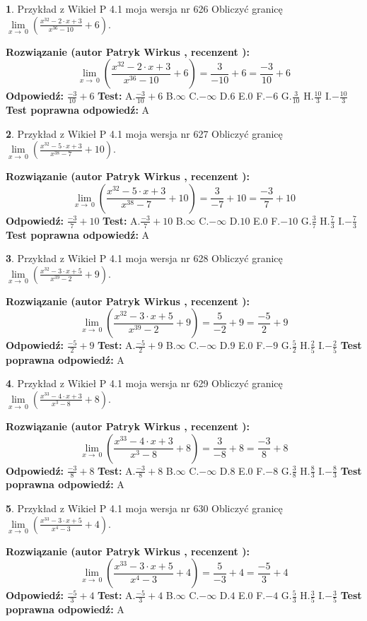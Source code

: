\documentclass[12pt, a4paper]{article}
\theoremstyle{definition} %
\newtheorem{zad}{}
\newcommand{\zadStart}[1]{\begin{zad}#1\newline}
\newcommand{\zadStop}{\end{zad}}
\newcommand{\rozwStart}[2]{\noindent \textbf{Rozwiązanie (autor #1 , recenzent #2): }\newline}
\newcommand{\rozwStop}{\newline}
\newcommand{\odpStart}{\noindent \textbf{Odpowiedź:}\newline}
\newcommand{\odpStop}{\newline}
\newcommand{\testStart}{\noindent \textbf{Test:}\newline}
\newcommand{\testStop}{\newline}
\newcommand{\kluczStart}{\noindent \textbf{Test poprawna odpowiedź:}\newline}
\newcommand{\kluczStop}{\newline}
\begin{document}
\zadStart{Przykład z Wikieł P 4.1 moja wersja nr 626}
Obliczyć granicę $\lim\limits_{x\to\ 0}(\frac{x^{32}-2 \cdot x +3}{x^{36}-10}+6)$.
\zadStop
\rozwStart{Patryk Wirkus}{}
$$\lim\limits_{x\to\ 0}(\frac{x^{32}-2 \cdot x +3}{x^{36}-10}+6)=\frac{3}{-10}+6=\frac{-3}{10}+6$$
\rozwStop
\odpStart
$\frac{-3}{10}+6$
\odpStop
\testStart
A.$\frac{-3}{10}+6$
B.$\infty$
C.$-\infty$
D.$6$
E.$0$
F.$-6$
G.$\frac{3}{10}$
H.$\frac{10}{3}$
I.$-\frac{10}{3}$
\testStop
\kluczStart
A
\kluczStop



\zadStart{Przykład z Wikieł P 4.1 moja wersja nr 627}
Obliczyć granicę $\lim\limits_{x\to\ 0}(\frac{x^{32}-5 \cdot x +3}{x^{38}-7}+10)$.
\zadStop
\rozwStart{Patryk Wirkus}{}
$$\lim\limits_{x\to\ 0}(\frac{x^{32}-5 \cdot x +3}{x^{38}-7}+10)=\frac{3}{-7}+10=\frac{-3}{7}+10$$
\rozwStop
\odpStart
$\frac{-3}{7}+10$
\odpStop
\testStart
A.$\frac{-3}{7}+10$
B.$\infty$
C.$-\infty$
D.$10$
E.$0$
F.$-10$
G.$\frac{3}{7}$
H.$\frac{7}{3}$
I.$-\frac{7}{3}$
\testStop
\kluczStart
A
\kluczStop



\zadStart{Przykład z Wikieł P 4.1 moja wersja nr 628}
Obliczyć granicę $\lim\limits_{x\to\ 0}(\frac{x^{32}-3 \cdot x +5}{x^{39}-2}+9)$.
\zadStop
\rozwStart{Patryk Wirkus}{}
$$\lim\limits_{x\to\ 0}(\frac{x^{32}-3 \cdot x +5}{x^{39}-2}+9)=\frac{5}{-2}+9=\frac{-5}{2}+9$$
\rozwStop
\odpStart
$\frac{-5}{2}+9$
\odpStop
\testStart
A.$\frac{-5}{2}+9$
B.$\infty$
C.$-\infty$
D.$9$
E.$0$
F.$-9$
G.$\frac{5}{2}$
H.$\frac{2}{5}$
I.$-\frac{2}{5}$
\testStop
\kluczStart
A
\kluczStop



\zadStart{Przykład z Wikieł P 4.1 moja wersja nr 629}
Obliczyć granicę $\lim\limits_{x\to\ 0}(\frac{x^{33}-4 \cdot x +3}{x^{3}-8}+8)$.
\zadStop
\rozwStart{Patryk Wirkus}{}
$$\lim\limits_{x\to\ 0}(\frac{x^{33}-4 \cdot x +3}{x^{3}-8}+8)=\frac{3}{-8}+8=\frac{-3}{8}+8$$
\rozwStop
\odpStart
$\frac{-3}{8}+8$
\odpStop
\testStart
A.$\frac{-3}{8}+8$
B.$\infty$
C.$-\infty$
D.$8$
E.$0$
F.$-8$
G.$\frac{3}{8}$
H.$\frac{8}{3}$
I.$-\frac{8}{3}$
\testStop
\kluczStart
A
\kluczStop



\zadStart{Przykład z Wikieł P 4.1 moja wersja nr 630}
Obliczyć granicę $\lim\limits_{x\to\ 0}(\frac{x^{33}-3 \cdot x +5}{x^{4}-3}+4)$.
\zadStop
\rozwStart{Patryk Wirkus}{}
$$\lim\limits_{x\to\ 0}(\frac{x^{33}-3 \cdot x +5}{x^{4}-3}+4)=\frac{5}{-3}+4=\frac{-5}{3}+4$$
\rozwStop
\odpStart
$\frac{-5}{3}+4$
\odpStop
\testStart
A.$\frac{-5}{3}+4$
B.$\infty$
C.$-\infty$
D.$4$
E.$0$
F.$-4$
G.$\frac{5}{3}$
H.$\frac{3}{5}$
I.$-\frac{3}{5}$
\testStop
\kluczStart
A
\kluczStop
\end{document}

